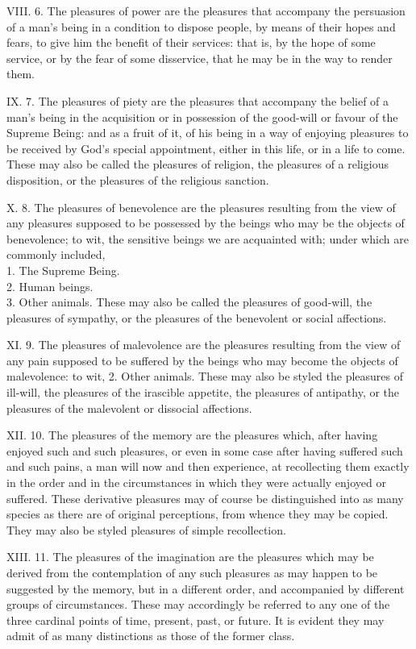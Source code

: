 \documentclass[12pt]{report}
\begin{document}
VIII. 6. The pleasures of power are the pleasures that accompany the
persuasion of a man's being in a condition to dispose people, by means
of their hopes and fears, to give him the benefit of their services:
that is, by the hope of some service, or by the fear of some disservice,
that he may be in the way to render them.

IX. 7. The pleasures of piety are the pleasures that accompany the
belief of a man's being in the acquisition or in possession of the
good-will or favour of the Supreme Being: and as a fruit of it, of his
being in a way of enjoying pleasures to be received by God's special
appointment, either in this life, or in a life to come. These may also
be called the pleasures of religion, the pleasures of a religious
disposition, or the pleasures of the religious sanction.

X. 8. The pleasures of benevolence are the pleasures resulting from the
view of any pleasures supposed to be possessed by the beings who may be
the objects of benevolence; to wit, the sensitive beings we are
acquainted with; under which are commonly included,\\
1. The Supreme Being.\\
2. Human beings.\\
3. Other animals. These may also be called the pleasures of good-will,
the pleasures of sympathy, or the pleasures of the benevolent or social
affections.

XI. 9. The pleasures of malevolence are the pleasures resulting from the
view of any pain supposed to be suffered by the beings who may become
the objects of malevolence: to wit, 2. Other animals. These may also be
styled the pleasures of ill-will, the pleasures of the irascible
appetite, the pleasures of antipathy, or the pleasures of the malevolent
or dissocial affections.

XII. 10. The pleasures of the memory are the pleasures which, after
having enjoyed such and such pleasures, or even in some case after
having suffered such and such pains, a man will now and then experience,
at recollecting them exactly in the order and in the circumstances in
which they were actually enjoyed or suffered. These derivative pleasures
may of course be distinguished into as many species as there are of
original perceptions, from whence they may be copied. They may also be
styled pleasures of simple recollection.

XIII. 11. The pleasures of the imagination are the pleasures which may
be derived from the contemplation of any such pleasures as may happen to
be suggested by the memory, but in a different order, and accompanied by
different groups of circumstances. These may accordingly be referred to
any one of the three cardinal points of time, present, past, or future.
It is evident they may admit of as many distinctions as those of the
former class.
\end{document}
